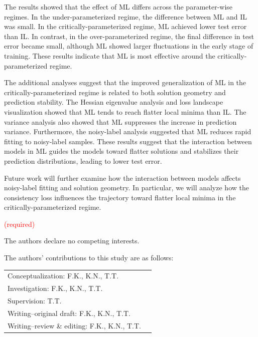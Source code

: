 \documentclass[dvipdfmx]{nolta}
\begin{document}
The results showed that the effect of ML differs across the parameter-wise regimes. In the under-parameterized regime, the difference between ML and IL was small. In the critically-parameterized regime, ML achieved lower test error than IL. In contrast, in the over-parameterized regime, the final difference in test error became small, although ML showed larger fluctuations in the early stage of training. These results indicate that ML is most effective around the critically-parameterized regime.

The additional analyses suggest that the improved generalization of ML in the critically-parameterized regime is related to both solution geometry and prediction stability. The Hessian eigenvalue analysis and loss landscape visualization showed that ML tends to reach flatter local minima than IL. The variance analysis also showed that ML suppresses the increase in prediction variance. Furthermore, the noisy-label analysis suggested that ML reduces rapid fitting to noisy-label samples. These results suggest that the interaction between models in ML guides the models toward flatter solutions and stabilizes their prediction distributions, leading to lower test error.

Future work will further examine how the interaction between models affects noisy-label fitting and solution geometry. In particular, we will analyze how the consistency loss influences the trajectory toward flatter local minima in the critically-parameterized regime.

\funding
\textcolor{red}{(required)}

\conflictsofinterest
The authors declare no competing interests.

\authorcontribution
The authors’ contributions to this study are as follows:

\begin{tabular}{ll}
Conceptualization: F.K., K.N., T.T.\\
Investigation: F.K., K.N., T.T.\\
Supervision: T.T.\\
Writing--original draft: F.K., K.N., T.T.\\
Writing--review \& editing: F.K., K.N., T.T.\\
\end{tabular}





\end{document}
